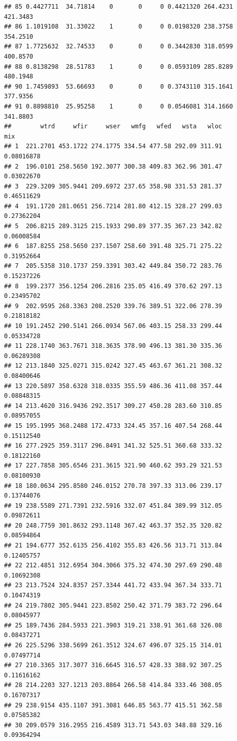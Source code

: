 \documentclass[]{article}
\begin{document}
\begin{verbatim}
## 85 0.4427711  34.71814    0       0     0 0.4421320 264.4231 421.3483
## 86 1.1019108  31.33022    1       0     0 0.0198320 238.3758 354.2510
## 87 1.7725632  32.74533    0       0     0 0.3442830 318.0599 400.8570
## 88 0.8138298  28.51783    1       0     0 0.0593109 285.8289 480.1948
## 90 1.7459893  53.66693    0       0     0 0.3743110 315.1641 377.9356
## 91 0.8898810  25.95258    1       0     0 0.0546081 314.1660 341.8803
##        wtrd     wfir     wser   wmfg   wfed   wsta   wloc        mix
## 1  221.2701 453.1722 274.1775 334.54 477.58 292.09 311.91 0.08016878
## 2  196.0101 258.5650 192.3077 300.38 409.83 362.96 301.47 0.03022670
## 3  229.3209 305.9441 209.6972 237.65 358.98 331.53 281.37 0.46511629
## 4  191.1720 281.0651 256.7214 281.80 412.15 328.27 299.03 0.27362204
## 5  206.8215 289.3125 215.1933 290.89 377.35 367.23 342.82 0.06008584
## 6  187.8255 258.5650 237.1507 258.60 391.48 325.71 275.22 0.31952664
## 7  205.5358 310.1737 259.3391 303.42 449.84 350.72 283.76 0.15237226
## 8  199.2377 356.1254 206.2816 235.05 416.49 370.62 297.13 0.23495702
## 9  202.9595 268.3363 208.2520 339.76 389.51 322.06 278.39 0.21818182
## 10 191.2452 290.5141 266.0934 567.06 403.15 258.33 299.44 0.05334728
## 11 228.1740 363.7671 318.3635 378.90 496.13 381.30 335.36 0.06289308
## 12 213.1840 325.0271 315.0242 327.45 463.67 361.21 308.32 0.08400646
## 13 220.5897 358.6328 318.0335 355.59 486.36 411.08 357.44 0.08848315
## 14 213.4620 316.9436 292.3517 309.27 450.28 283.60 310.85 0.08957055
## 15 195.1995 368.2488 172.4733 324.45 357.16 407.54 268.44 0.15112540
## 16 277.2925 359.3117 296.8491 341.32 525.51 360.68 333.32 0.18122160
## 17 227.7858 305.6546 231.3615 321.90 460.62 393.29 321.53 0.08100930
## 18 180.0634 295.8580 246.0152 270.78 397.33 313.06 239.17 0.13744076
## 19 238.5589 271.7391 232.5916 332.07 451.84 389.99 312.05 0.09872611
## 20 248.7759 301.8632 293.1148 367.42 463.37 352.35 320.82 0.08594864
## 21 194.6777 352.6135 256.4102 355.83 426.56 313.71 313.84 0.12405757
## 22 212.4851 312.6954 304.3066 375.32 474.30 297.69 290.48 0.10692308
## 23 213.7524 324.8357 257.3344 441.72 433.94 367.34 333.71 0.10474319
## 24 219.7802 305.9441 223.8502 250.42 371.79 383.72 296.64 0.08045977
## 25 189.7436 284.5933 221.3903 319.21 338.91 361.68 326.08 0.08437271
## 26 225.5296 338.5699 261.3512 324.67 496.07 325.15 314.01 0.07497714
## 27 210.3365 317.3077 316.6645 316.57 428.33 388.92 307.25 0.11616162
## 28 214.2203 327.1213 203.8864 266.58 414.84 333.46 308.05 0.16707317
## 29 238.9154 435.1107 391.3081 646.85 563.77 415.51 362.58 0.07585382
## 30 209.0579 316.2955 216.4589 313.71 543.03 348.88 329.16 0.09364294

\end{verbatim}
\end{document}
